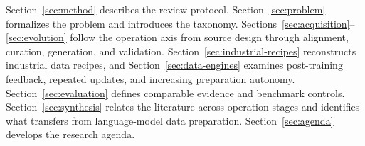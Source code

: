 Section~\ref{sec:method} describes the review protocol.
Section~\ref{sec:problem} formalizes the problem and introduces the taxonomy.
Sections~\ref{sec:acquisition}--\ref{sec:evolution} follow the operation axis from source design through alignment, curation, generation, and validation.
Section~\ref{sec:industrial-recipes} reconstructs industrial data recipes, and Section~\ref{sec:data-engines} examines post-training feedback, repeated updates, and increasing preparation autonomy.
Section~\ref{sec:evaluation} defines comparable evidence and benchmark controls.
Section~\ref{sec:synthesis} relates the literature across operation stages and identifies what transfers from language-model data preparation.
Section~\ref{sec:agenda} develops the research agenda.
